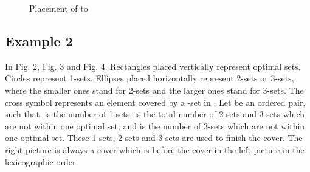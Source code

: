 \documentclass[runningheads,a4paper]{llncs}
\numberwithin{equation}{section}
\begin{document}
\begin{example}[Blocking]
\begin{figure}
\begin{center}
\caption{Placement of  to }
\end{center}
\end{figure}

\end{example}


\subsection{Example 2}
\begin{example}
In Fig. 2, Fig. 3 and Fig. 4. Rectangles placed vertically represent optimal sets. Circles represent 1-sets. Ellipses placed horizontally represent 2-sets or 3-sets, where the smaller ones stand for 2-sets and the larger ones stand for 3-sets. The cross symbol represents an element covered by a -set in . Let  be an ordered pair, such that,  is the number of 1-sets,  is the total number of 2-sets and 3-sets which are not within one optimal set, and  is the number of 3-sets which are not within one optimal set. These 1-sets, 2-sets and 3-sets are used to finish the cover. The right picture is always a cover which is before the cover in the left picture in the lexicographic order.
\end{example}
\end{document}
